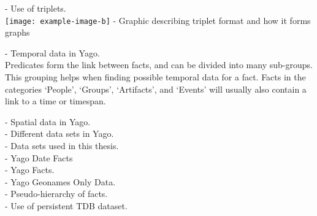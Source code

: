 - Use of triplets.\\

\texttt{[image: example-image-b]}
- Graphic describing triplet format and how it forms graphs


- Temporal data in Yago.\\
Predicates form the link between facts, and can be divided into many sub-groups. This grouping helps when finding possible temporal data for a fact. Facts in the categories `People', `Groups', `Artifacts', and `Events' will usually also contain a link to a time or timespan.

- Spatial data in Yago.\\


- Different data sets in Yago.\\
- Data sets used in this thesis.\\
	- Yago Date Facts\\
	- Yago Facts.\\
	- Yago Geonames Only Data.\\
- Pseudo-hierarchy of facts.\\
- Use of persistent TDB dataset.\\

\clearpage